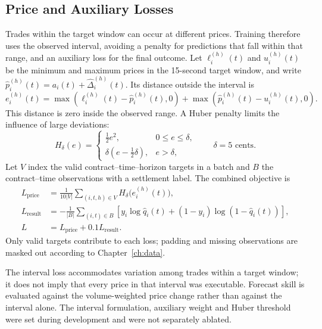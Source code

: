 \documentclass[12pt,a4paper,oneside]{report}
\begin{document}
\subsection{Price and Auxiliary Losses}\label{sec:ingame-loss}
Trades within the target window can occur at different prices. Training
therefore uses the observed interval, avoiding a penalty for predictions that
fall within that range, and an auxiliary loss for the final outcome. Let
$\ell_i^{(h)}(t)$ and $u_i^{(h)}(t)$ be the minimum and maximum prices in the
15-second target window, and write
$\widehat p_i^{(h)}(t)=a_i(t)+\widehat\Delta_i^{(h)}(t)$. Its distance outside
the interval is
\begin{equation}
 e_i^{(h)}(t)=\max\!\left(\ell_i^{(h)}(t)-\widehat p_i^{(h)}(t),0\right)
             +\max\!\left(\widehat p_i^{(h)}(t)-u_i^{(h)}(t),0\right).
 \label{eq:interval-distance}
\end{equation}
This distance is zero inside the observed range. A Huber penalty limits the
influence of large deviations:
\begin{equation}
 H_\delta(e)=\begin{cases}
 \tfrac12 e^2,&0\leq e\leq\delta,\\
 \delta(e-\tfrac12\delta),&e>\delta,
 \end{cases}
 \qquad \delta=5\text{ cents}.
\end{equation}
Let $V$ index the valid contract--time--horizon targets in a batch and $B$ the
contract--time observations with a settlement label. The combined objective is
\begin{align}
 L_{\mathrm{price}}&=\frac{1}{10|V|}\sum_{(i,t,h)\in V}
                 H_\delta\bigl(e_i^{(h)}(t)\bigr),\\
 L_{\mathrm{result}}&=-\frac{1}{|B|}\sum_{(i,t)\in B}
  \left[y_i\log\widehat q_i(t)+(1-y_i)\log(1-\widehat q_i(t))\right],\\
 L&=L_{\mathrm{price}}+0.1L_{\mathrm{result}}.
 \label{eq:combined-loss}
\end{align}
Only valid targets contribute to each loss; padding and missing observations
are masked out according to Chapter~\ref{ch:data}.

The interval loss accommodates variation among trades within a target window;
it does not imply that every price in that interval was executable. Forecast
skill is evaluated against the volume-weighted price change rather than against
the interval alone. The interval formulation, auxiliary weight and Huber
threshold were set during development and were not separately ablated.
\end{document}
